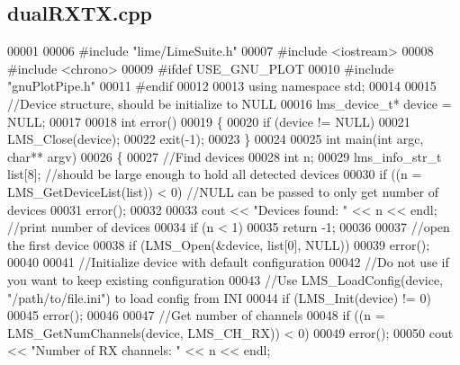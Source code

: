 \subsection{dual\+R\+X\+T\+X.\+cpp}
\label{dualRXTX_8cpp_source}

\begin{DoxyCode}
00001 
00006 \textcolor{preprocessor}{#include "lime/LimeSuite.h"}
00007 \textcolor{preprocessor}{#include <iostream>}
00008 \textcolor{preprocessor}{#include <chrono>}
00009 \textcolor{preprocessor}{#ifdef USE\_GNU\_PLOT}
00010 \textcolor{preprocessor}{#include "gnuPlotPipe.h"}
00011 \textcolor{preprocessor}{#endif}
00012 
00013 \textcolor{keyword}{using namespace }std;
00014 
00015 \textcolor{comment}{//Device structure, should be initialize to NULL}
00016 lms_device_t* device = NULL;
00017 
00018 \textcolor{keywordtype}{int} error()
00019 \{
00020     \textcolor{keywordflow}{if} (device != NULL)
00021         LMS_Close(device);
00022     exit(-1);
00023 \}
00024 
00025 \textcolor{keywordtype}{int} main(\textcolor{keywordtype}{int} argc, \textcolor{keywordtype}{char}** argv)
00026 \{
00027     \textcolor{comment}{//Find devices}
00028     \textcolor{keywordtype}{int} n;
00029     lms_info_str_t list[8]; \textcolor{comment}{//should be large enough to hold all detected devices}
00030     \textcolor{keywordflow}{if} ((n = LMS_GetDeviceList(list)) < 0) \textcolor{comment}{//NULL can be passed to only get number of devices}
00031         error();
00032 
00033     cout << \textcolor{stringliteral}{"Devices found: "} << n << endl; \textcolor{comment}{//print number of devices}
00034     \textcolor{keywordflow}{if} (n < 1)
00035         \textcolor{keywordflow}{return} -1;
00036 
00037     \textcolor{comment}{//open the first device}
00038     \textcolor{keywordflow}{if} (LMS_Open(&device, list[0], NULL))
00039         error();
00040 
00041     \textcolor{comment}{//Initialize device with default configuration}
00042     \textcolor{comment}{//Do not use if you want to keep existing configuration}
00043     \textcolor{comment}{//Use LMS\_LoadConfig(device, "/path/to/file.ini") to load config from INI}
00044     \textcolor{keywordflow}{if} (LMS_Init(device) != 0)
00045         error();
00046 
00047     \textcolor{comment}{//Get number of channels}
00048     \textcolor{keywordflow}{if} ((n = LMS_GetNumChannels(device, LMS_CH_RX)) < 0)
00049         error();
00050     cout << \textcolor{stringliteral}{"Number of RX channels: "} << n << endl;

\end{DoxyCode}

